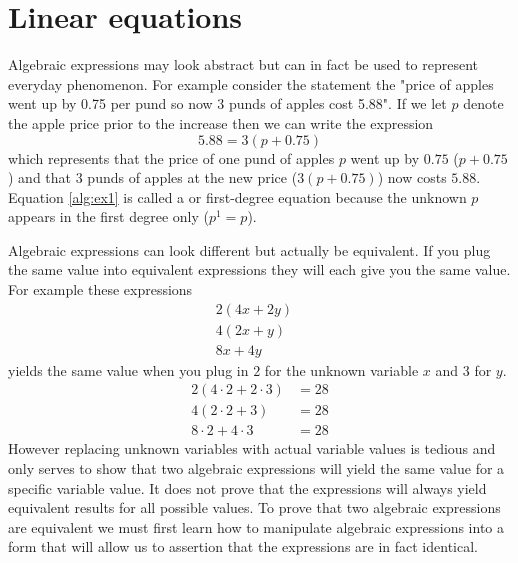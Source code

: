 \section{Linear equations}
Algebraic expressions may look abstract but can in fact be used to represent everyday phenomenon. For example consider the statement the "price of apples went up by 0.75 per pund so now 3 punds of apples cost 5.88". If we let $p$ denote the apple price prior to the increase then we can write the expression
\begin{equation}\label{alg:ex1}
5.88 = 3(p + 0.75)
\end{equation}
which represents that the price of one pund of apples $p$ went up by $0.75$ ($p + 0.75$) and that $3$ punds of apples at the new price ($3(p + 0.75)$) now costs $5.88$. Equation \ref{alg:ex1} is called a  or first-degree equation because the unknown $p$ appears in the first degree only ($p^1 = p$).

Algebraic expressions can look different but actually be equivalent. If you plug the same value into equivalent expressions they will each give you the same value. For example these expressions
\begin{align*}
2(4x+2y) &   \\
4(2x+y)  &  \\
8x+4y         &
\end{align*}
yields the same value when you plug in $2$ for the unknown variable $x$ and $3$ for $y$.
\begin{align*}
2(4 \cdot 2 + 2 \cdot 3)  &= 28\\
4(2 \cdot 2 + 3)          &= 28\\
8 \cdot 2 + 4 \cdot 3     &= 28
\end{align*}
However replacing unknown variables with actual variable values is tedious and only serves to show that two algebraic expressions will yield the same value for a specific variable value. It does not prove that the expressions will always yield equivalent results for all possible values. To prove that two algebraic expressions are equivalent we must first learn how to manipulate algebraic expressions into a form that will allow us to assertion that the expressions are in fact identical.

